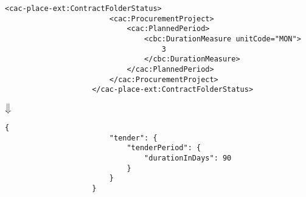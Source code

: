 \begin{itemize}
                \begin{lstlisting}[language=lXML]
                    <cac-place-ext:ContractFolderStatus>
                        <cac:ProcurementProject>
                            <cac:PlannedPeriod>
                                <cbc:DurationMeasure unitCode="MON">
                                    3
                                </cbc:DurationMeasure>
                            </cac:PlannedPeriod>
                        </cac:ProcurementProject>
                    </cac-place-ext:ContractFolderStatus>
                \end{lstlisting}
                
                \begin{center}
                    $\big\Downarrow$
                \end{center}
                
                \begin{lstlisting}[language=lJSON]
                    {
                        "tender": {
                            "tenderPeriod": {
                                "durationInDays": 90
                            }
                        }
                    }
                \end{lstlisting}
        \end{itemize}
        
